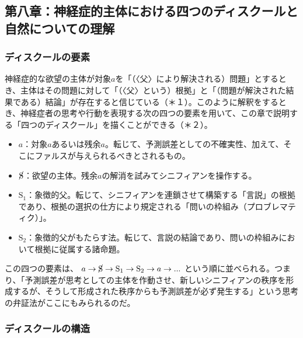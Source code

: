 \subsection{第八章：神経症的主体における四つのディスクールと自然についての理解}\label{ux7b2cux516bux7ae0ux795eux7d4cux75c7ux7684ux4e3bux4f53ux306bux304aux3051ux308bux56dbux3064ux306eux30c7ux30a3ux30b9ux30afux30fcux30ebux3068ux81eaux7136ux306bux3064ux3044ux3066ux306eux7406ux89e3}

\subsubsection{ディスクールの要素}\label{ux30c7ux30a3ux30b9ux30afux30fcux30ebux306eux8981ux7d20}

神経症的な欲望の主体が対象\(a\)を「（〈父〉により解決される）問題」とするとき、主体はその問題に対して「（〈父〉という）根拠」と「（問題が解決された結果である）結論」が存在すると信じている（＊１）。このように解釈をするとき、神経症者の思考や行動を表現する次の四つの要素を用いて、この章で説明する「四つのディスクール」を描くことができる（＊２）。

\begin{itemize}
\tightlist
\item
  \(a\)：対象\(a\)あるいは残余\(a\)。転じて、予測誤差としての不確実性、加えて、そこにファルスが与えられるべきとされるもの。
\item
  \(\cancel{\textrm{S}}\)：欲望の主体。残余\(a\)の解消を試みてシニフィアンを操作する。
\item
  \(\textrm{S}_1\)：象徴的父。転じて、シニフィアンを連鎖させて構築する「言説」の根拠であり、根拠の選択の仕方により規定される「問いの枠組み（プロブレマティク）」。
\item
  \(\textrm{S}_2\)：象徴的父がもたらす法。転じて、言説の結論であり、問いの枠組みにおいて根拠に従属する諸命題。
\end{itemize}

この四つの要素は、
\(a \rightarrow \cancel{\textrm{S}} \rightarrow \textrm{S}_1 \rightarrow \textrm{S}_2 \rightarrow a \rightarrow ...\)
という順に並べられる。つまり、「予測誤差が思考としての主体を作動させ、新しいシニフィアンの秩序を形成するが、そうして形成された秩序からも予測誤差が必ず発生する」という思考の弁証法がここにもみられるのだ。

\subsubsection{ディスクールの構造}\label{ux30c7ux30a3ux30b9ux30afux30fcux30ebux306eux69cbux9020}

